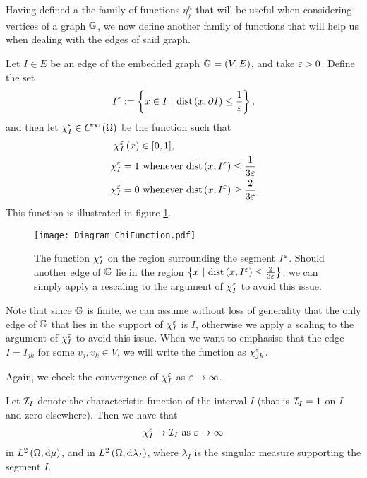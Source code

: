 Having defined a the family of functions $\eta_j^n$ that will be useful when considering vertices of a graph $\mathbb{G}$, we now define another family of functions that will help us when dealing with the edges of said graph.
\begin{definition} \label{def:ChiDef}
	Let $I\in E$ be an edge of the embedded graph $\mathbb{G}=\left( V,E \right)$, and take $\varepsilon>0$.
	Define the set 
	\begin{align} \label{eq:ShortenedIntervalDef}
		I^{\varepsilon} := \left\{  x\in I \ \vert \ \mathrm{dist}\left( x, \partial I \right)\leq \frac{1}{\varepsilon} \right\},
	\end{align}
	and then let $\chi_{I}^\varepsilon\in C^{\infty}\left( \Omega \right)$ be the function such that 
	\begin{align*}
		\chi_I^\varepsilon\left( x \right) &\in [0,1], \\
		\chi_I^\varepsilon = 1 &\text{ whenever } \mathrm{dist}\left( x, I^\varepsilon \right)\leq \frac{1}{3\varepsilon} \\
		\chi_I^\varepsilon = 0 &\text{ whenever } \mathrm{dist}\left( x, I^\varepsilon \right)\geq \frac{2}{3\varepsilon}
\end{align*}
	This function is illustrated in figure \ref{fig:chiDiagram}.
	\begin{figure}[b!]
		\centering
		\texttt{[image: Diagram\_ChiFunction.pdf]}
		\caption{\label{fig:chiDiagram} The function $\chi_I^\varepsilon$ on the region surrounding the segment $I^\varepsilon$. Should another edge of $\mathbb{G}$ lie in the region $\clbracs{x \ \vert \ \mathrm{dist}\bracs{x,I^\eps}\leq\frac{2}{3\eps}}$, we can simply apply a rescaling to the argument of $\chi_I^\varepsilon$ to avoid this issue.}
	\end{figure}
	Note that since $\mathbb{G}$ is finite, we can assume without loss of generality that the only edge of $\mathbb{G}$ that lies in the support of $\chi_I^\varepsilon$ is $I$, otherwise we apply a scaling to the argument of $\chi_I^\varepsilon$ to avoid this issue.
	When we want to emphasise that the edge $I=I_{jk}$ for some $v_j, v_k\in V$, we will write the function as $\chi_{jk}^\varepsilon$.
\end{definition}
Again, we check the convergence of $\chi_I^\varepsilon$ as $\varepsilon\rightarrow\infty$.
\begin{lemma} \label{lem:ChiConv}
	Let $\mathcal{I}_{I}$ denote the characteristic function of the interval $I$ (that is $\mathcal{I}_{I}=1$ on $I$ and zero elsewhere).
	Then we have that 
	\begin{align*}
		\chi_I^\varepsilon \rightarrow \mathcal{I}_{I} \ \text{as} \ \varepsilon \rightarrow\infty
	\end{align*}
	in $L^{2}\left( \Omega,\mathrm{d}\mu \right)$, and in $L^{2}\left( \Omega,\mathrm{d}\lambda_I \right)$, where $\lambda_I$ is the singular measure supporting the segment $I$.
\end{lemma}
